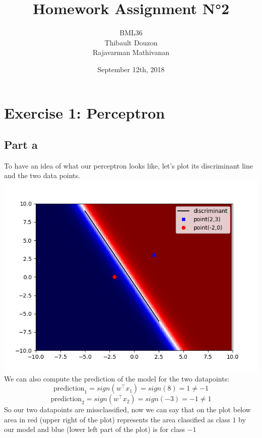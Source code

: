 \documentclass[a4paper, 10pt]{article}
\title{Homework Assignment N°2}
\author{BML36\\Thibault Douzon\\Rajavarman Mathivanan}
\date{September 12th, 2018}
\begin{document}
\maketitle

\pagebreak

\tableofcontents
\pagebreak
\section{Exercise 1: Perceptron}
\subsection{Part a}
To have an idea of what our perceptron looks like, let's plot its discriminant line
and the two data points.
\\
\includegraphics[scale=0.6]{ex1_a.png}
\\
We can also compute the prediction of the model for the two datapoints:
$$
\text{prediction}_1 = sign(w^\top x_1) = sign(8) = 1 \ne -1
$$
$$
\text{prediction}_2 = sign(w^\top x_2) = sign(-3) = -1 \ne 1
$$
So our two datapoints are missclassified, now we can say that on the plot below 
area in red (upper right of the plot) represents the area classified as class $1$ by our model and
blue (lower left part of the plot) is for class $-1$
\end{document}
